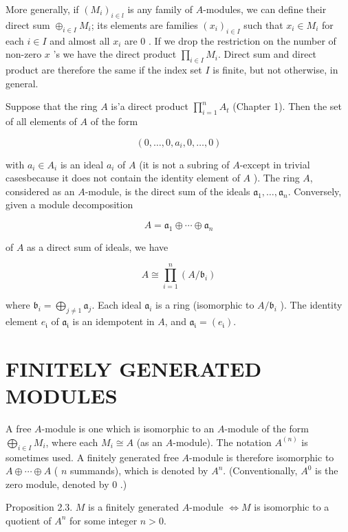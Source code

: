 \documentclass{standalone}
\theoremstyle{definition}
\theoremstyle{remark}
\begin{document}
More generally, if $\left(M_{i}\right)_{i \in l}$ is any family of $A$-modules, we can define their direct sum $\oplus_{i \in I} M_{i}$; its elements are families $\left(x_{i}\right)_{i \in I}$ such that $x_{i} \in M_{i}$ for each $i \in I$ and almost all $x_{i}$ are 0 . If we drop the restriction on the number of non-zero $x$ 's we have the direct product $\prod_{i \in I} M_{i}$. Direct sum and direct product are therefore the same if the index set $I$ is finite, but not otherwise, in general.

Suppose that the ring $A$ is'a direct product $\prod_{i=1}^{n} A_{t}$ (Chapter 1). Then the set of all elements of $A$ of the form

\[
\left(0, \ldots, 0, a_{i}, 0, \ldots, 0\right)
\]

with $a_{i} \in A_{i}$ is an ideal $a_{i}$ of $A$ (it is not a subring of $A$-except in trivial casesbecause it does not contain the identity element of $A$ ). The ring $A$, considered as an $A$-module, is the direct sum of the ideals $\mathfrak{a}_{1}, \ldots, \mathfrak{a}_{n}$. Conversely, given a module decomposition

\[
A=\mathfrak{a}_{1} \oplus \cdots \oplus \mathfrak{a}_{n}
\]

of $A$ as a direct sum of ideals, we have

\[
A \cong \prod_{i=1}^{n}\left(A / \mathfrak{b}_{i}\right)
\]

where $\mathfrak{b}_{i}=\bigoplus_{j \neq 1} \mathfrak{a}_{j}$. Each ideal $\mathfrak{a}_{i}$ is a ring (isomorphic to $A / \mathfrak{b}_{i}$ ). The identity element $e_{\mathfrak{i}}$ of $\mathfrak{a}_{\mathfrak{i}}$ is an idempotent in $A$, and $\mathfrak{a}_{\mathfrak{i}}=\left(e_{\mathfrak{i}}\right)$.

\section{FINITELY GENERATED MODULES}
A free $A$-module is one which is isomorphic to an $A$-module of the form $\bigoplus_{i \in I} M_{i}$, where each $M_{i} \cong A$ (as an $A$-module). The notation $A^{(n)}$ is sometimes used. A finitely generated free $A$-module is therefore isomorphic to $A \oplus \cdots \oplus A$ ( $n$ summands), which is denoted by $A^{n}$. (Conventionally, $A^{0}$ is the zero module, denoted by 0 .)

Proposition 2.3. $M$ is a finitely generated $A$-module $\Leftrightarrow M$ is isomorphic to a quotient of $A^{n}$ for some integer $n>0$.
\end{document}
